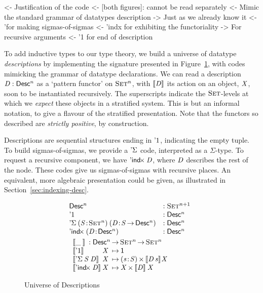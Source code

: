 \begin{wstructure}
<- Justification of the code 
    <- [both figures]: cannot be read separately
    <- Mimic the standard grammar of datatypes description
        -> Just as we already know it
        <- '\Sigma for making sigmas-of-sigmas
        <- 'indx for exhibiting the functoriality
            -> For recursive arguments
        <- '1 for end of description
\end{wstructure}

To add inductive types to our type theory, we build a universe of
datatype \emph{descriptions} by implementing the signature presented
in Figure~\ref{fig:desc_universe}, with codes mimicking the grammar of
datatype declarations. We can read a description $\V{D}:\Desc^{n}$ as
a `pattern functor' on $\Set^{n}$, with $\SYMBdescop{\V{D}}$ its
action on an object, \(\V{X}\), soon to be instantiated
recursively. The superscripts indicate the $\Set$-levels at which we
\emph{expect} these objects in a stratified system. This is but an
informal notation, to give a flavour of the stratified
presentation. Note that the functors so described are \emph{strictly
  positive}, by construction.

Descriptions are sequential structures ending in $\DUnit$,
indicating the empty tuple. To build sigmas-of-sigmas, we provide a
$\SYMBDSigma$ code, interpreted as a $\Sigma$-type. To request a
recursive component, we have $\DIndx{\V{D}}$, where \(\V{D}\)
describes the rest of the node. These codes give us
sigmas-of-sigmas with recursive places. An equivalent, more algebraic presentation
could be given, as illustrated in Section~\ref{sec:indexing-desc}.

\begin{figure}
\[\stk{
\begin{array}{@{}ll}
\Desc^n 
    &: \Set^{n+1}\\
\DUnit 
    &: \Desc^{n}\\
\DSigma{(\Bhab{\V{S}}{\Set^{n}})}{(\Bhab{\V{D}}{\V{S} \To \Desc^{n}})} 
    &: \Desc^{n}\\
\DIndx{(\Bhab{\V{D}}{\Desc^{n}})} 
    &: \Desc^{n} \\
\end{array}
\smallskip\\
\begin{array}{l@{\V{X}\:\mapsto\:}l}     
\multicolumn{2}{l}{\descop{\_\:}{} : \Desc^{n} \To \Set^{n} \To \Set^{n}} \\
 \descop{\DUnit}{} &  \Unit \\
 \descop{\DSigma{\V{S}}{\V{D}}}{} &
     \SIGMAS{\Bhab{\V{s}}{\V{S}}}{\descop{\V{D}\,\V{s}}{\!\V{X}}}  \\
\descop{\DIndx{\V{D}}}{}  &  \TIMES{\V{X}}{\descop{\V{D}}{\V{X}}}
\end{array}
}\]

\caption{Universe of Descriptions}
\label{fig:desc_universe}
 
\end{figure}

